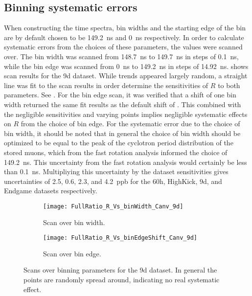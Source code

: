 \subsection{Binning systematic errors}
\label{sub:binning_systematic_errors}


When constructing the time spectra, bin widths and the starting edge of the bin are by default chosen to be \SI{149.2}{ns} and \SI{0}{ns} respectively. In order to calculate systematic errors from the choices of these parameters, the values were scanned over. The bin width was scanned from \SI{148.7}{ns} to \SI{149.7}{ns} in steps of \SI{0.1}{ns}, while the bin edge was scanned from \SI{0}{ns} to \SI{149.2}{ns} in steps of \SI{14.92}{ns}.  shows scan results for the 9d dataset. While trends appeared largely random, a straight line was fit to the scan results in order determine the sensitivities of $R$ to both parameters. See . For the bin edge scan, it was verified that a shift of one bin width returned the same fit results as the default shift of . This combined with the negligible sensitivities and varying points implies negligible systematic effects on $R$ from the choice of bin edge. For the systematic error due to the choice of bin width, it should be noted that in general the choice of bin width should be optimized to be equal to the peak of the cyclotron period distribution of the stored muons, which from the fast rotation analysis informed the choice of \SI{149.2}{ns}. This uncertainty from the fast rotation analysis would certainly be less than \SI{0.1}{ns}. Multipliying this uncertainty by the dataset sensitivities gives uncertainties of \SI{2.5}{}, \SI{0.6}{}, \SI{2.3}{}, and \SI{4.2}{ppb} for the 60h, HighKick, 9d, and Endgame datasets respectively.




\begin{figure}
\centering
    \begin{subfigure}[t]{0.45\textwidth}
        \centering
        \texttt{[image: FullRatio\_R\_Vs\_binWidth\_Canv\_9d]}
        \caption{Scan over bin width.}
    \end{subfigure}%
    \hspace{1cm}
    \begin{subfigure}[t]{0.45\textwidth}
        \centering
        \texttt{[image: FullRatio\_R\_Vs\_binEdgeShift\_Canv\_9d]}
        \caption{Scan over bin edge.}
    \end{subfigure}
\caption[Scans over binning parameters]{Scans over binning parameters for the 9d dataset. In general the points are randomly spread around, indicating no real systematic effect.}
\label{fig:binParametersScan}
\end{figure}


